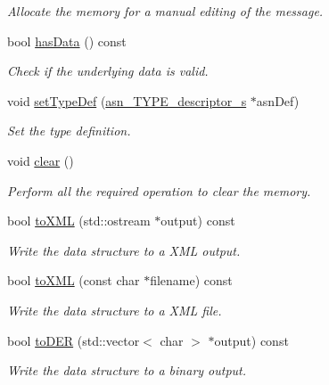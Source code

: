\begin{DoxyCompactItemize}
\begin{DoxyCompactList}\small\item\em Allocate the memory for a manual editing of the message. \end{DoxyCompactList}\item 
bool \hyperlink{classASN1CContainer_a67a086c665ecbf7a54e390c8fb7df47f}{has\+Data} () const 
\begin{DoxyCompactList}\small\item\em Check if the underlying data is valid. \end{DoxyCompactList}\item 
void \hyperlink{classASN1CContainer_a61559655caab168362a30c0538950ba3}{set\+Type\+Def} (\hyperlink{structasn__TYPE__descriptor__s}{asn\+\_\+\+T\+Y\+P\+E\+\_\+descriptor\+\_\+s} $\ast$asn\+Def)
\begin{DoxyCompactList}\small\item\em Set the type definition. \end{DoxyCompactList}\item 
void \hyperlink{classASN1CContainer_a6492cd5793ca9e2ab073445b358a68b5}{clear} ()
\begin{DoxyCompactList}\small\item\em Perform all the required operation to clear the memory. \end{DoxyCompactList}\item 
bool \hyperlink{classASN1CContainer_ae444a9554d1a856d74a942f70a3b2fb8}{to\+X\+ML} (std\+::ostream $\ast$output) const 
\begin{DoxyCompactList}\small\item\em Write the data structure to a X\+ML output. \end{DoxyCompactList}\item 
bool \hyperlink{classASN1CContainer_a165c57c9a77d80d5f8cd6c2d6b902650}{to\+X\+ML} (const char $\ast$filename) const 
\begin{DoxyCompactList}\small\item\em Write the data structure to a X\+ML file. \end{DoxyCompactList}\item 
bool \hyperlink{classASN1CContainer_af84be317f31518978a63621b4fc67c40}{to\+D\+ER} (std\+::vector$<$ char $>$ $\ast$output) const 
\begin{DoxyCompactList}\small\item\em Write the data structure to a binary output. \end{DoxyCompactList}\item 

\end{DoxyCompactItemize}
